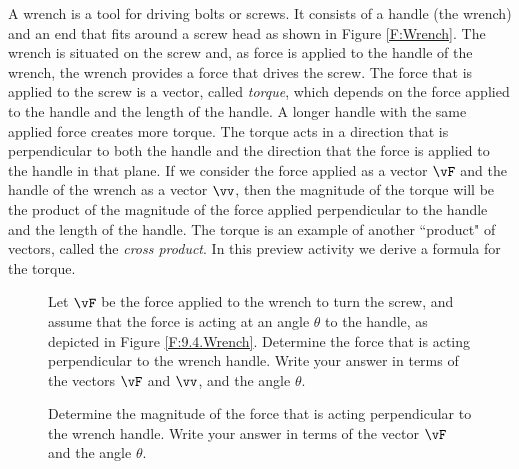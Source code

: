 \begin{pa} \label{PA:9.4}
A wrench is a tool for driving bolts or screws. It consists of a handle (the wrench) and an end that fits around a screw head as shown in Figure \ref{F:Wrench}. The wrench is situated on the screw and, as force is applied to the handle of the wrench, the wrench provides a force that drives the screw. The force that is applied to the screw is a vector, called \emph{torque}, which depends on the force applied to the handle and the length of the handle. A longer handle with the same applied force creates more torque. The torque acts in a direction that is perpendicular to both the handle and the direction that the force is applied to the handle in that plane. If we consider the force applied as a vector $\vF$ and the handle of the wrench as a vector $\vv$, then the magnitude of the torque will be the product of the magnitude of the force applied perpendicular to the handle and the length of the handle. The torque is an example of another ``product" of vectors, called the \emph{cross product}. In this preview activity we derive a formula for the torque.
\begin{figure}[ht]
\begin{minipage}{4in}
    \ba
    \item Let $\vF$ be the force applied to the wrench to turn the screw, and assume that the force is acting at an angle $\theta$ to the handle, as depicted in Figure \ref{F:9.4.Wrench}. Determine the force that is acting perpendicular to the wrench handle. Write your answer in terms of the vectors $\vF$ and $\vv$, and the angle $\theta$.

\begin{comment}

We are looking for the projection of the vector $\vF$ perpendicular to the vector $\vv$. We have seen that this is just
\begin{align*}
\proj_{\vv} \vF &= \vv - \frac{\vF \cdot \vv}{\vv \cdot \vv} \vv \\
    &= \vv - \cos(\theta) \frac{|\vF|}{|\vv|} \vv.
\end{align*}
This is the vector given by the dashed segment in Figure \ref{F:Wrench}, emanating from the vector $\vv$ to the tip of the vector $\vF$.

\end{comment}

    \item Determine the magnitude of the force that is acting perpendicular to the wrench handle. Write your answer in terms of the vector $\vF$ and the angle $\theta$.


\end{minipage}
\end{figure}
\end{pa}
